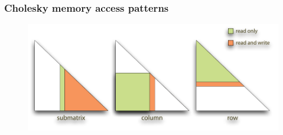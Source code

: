 \begin{frame}[fragile]
%
  \frametitle{Cholesky memory access patterns}
%
  \begin{figure}
    \centering
    \includegraphics[scale=0.7]{figures/cholesky-memory.pdf}
  \end{figure}
%
\end{frame}

